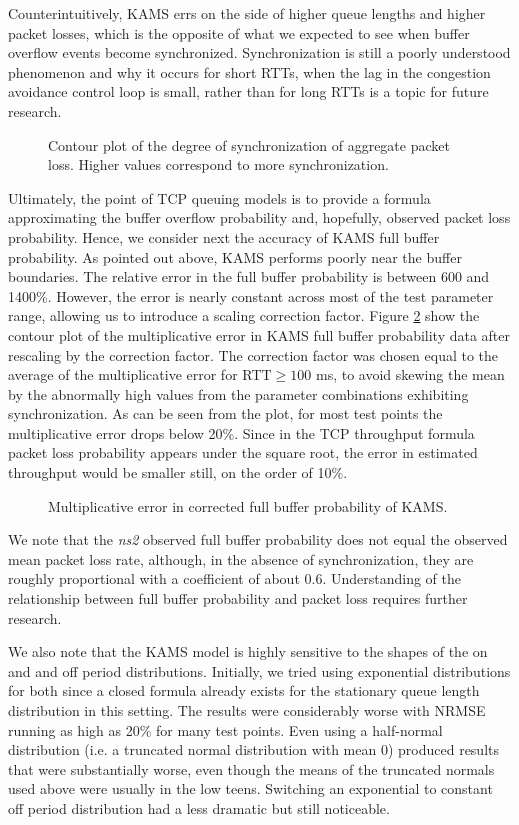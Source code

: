 \documentclass{IEEEtran}[10pt,letterpaper,conference]
\begin{document}
Counterintuitively, KAMS errs on the side of higher queue lengths and higher packet losses, which is the opposite of what we expected to see when buffer overflow events become synchronized. Synchronization is still a poorly understood phenomenon and why it occurs for short RTTs, when the lag in the congestion avoidance control loop is small, rather than for long RTTs is a topic for future research.
\begin{figure}[ht]
\caption{Contour plot of the degree of synchronization of aggregate packet loss. Higher values correspond to more synchronization.}
\label{sync}
\end{figure}

Ultimately, the point of TCP queuing models is to provide a formula approximating the buffer overflow probability and, hopefully, observed packet loss probability. Hence, we consider next the accuracy of KAMS full buffer probability. As pointed out above, KAMS performs poorly near the buffer boundaries. The relative error in the full buffer probability is between 600 and 1400\%. However, the error is nearly constant across most of the test parameter range, allowing us to introduce a scaling correction factor. Figure \ref{full_buffer_error} show the contour plot of the multiplicative error in KAMS full buffer probability data after rescaling by the correction factor. The correction factor was chosen equal to the average of the multiplicative error for RTT$\ge 100$ ms, to avoid skewing the mean by the abnormally high values from the parameter combinations exhibiting synchronization. As can be seen from the plot, for most test points the multiplicative error drops below 20\%. Since in the TCP throughput formula packet loss probability appears under the square root, the error in estimated throughput would be smaller still, on the order of 10\%.
\begin{figure}[ht]
\caption{Multiplicative error in corrected full buffer probability of KAMS.}
\label{full_buffer_error}
\end{figure}

We note that the \emph{ns2} observed full buffer probability does not equal the observed mean packet loss rate, although, in the absence of synchronization, they are roughly proportional with a coefficient of about 0.6. Understanding of the relationship between full buffer probability and packet loss requires further research.

We also note that the KAMS model is highly sensitive to the shapes of the on and and off period distributions. Initially, we tried using exponential distributions for both since a closed formula already exists for the stationary queue length distribution in this setting. The results were considerably worse with NRMSE running as high as 20\% for many test points. Even using a half-normal distribution (i.e. a truncated normal distribution with mean 0) produced results that were substantially worse, even though the means of the truncated normals used above were usually in the low teens. Switching an exponential to constant off period distribution had a less dramatic but still noticeable.
\end{document}
